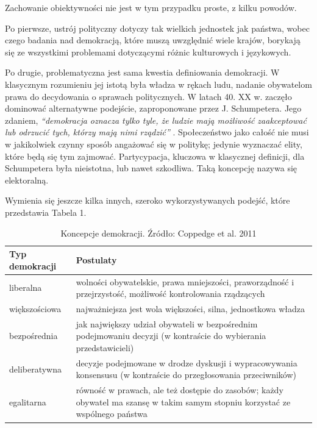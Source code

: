 \documentclass[12pt]{article}
\begin{document}
Zachowanie obiektywności nie jest w tym przypadku proste, z kilku powodów.

Po pierwsze, ustrój polityczny dotyczy tak wielkich jednostek jak państwa, wobec czego badania nad demokracją, które muszą uwzględnić wiele krajów, borykają się ze wszystkimi problemami dotyczącymi różnic kulturowych i językowych.

Po drugie, problematyczna jest sama kwestia definiowania demokracji. W klasycznym rozumieniu jej istotą była władza w rękach ludu, nadanie obywatelom prawa do decydowania o sprawach politycznych. W latach 40. XX w. zaczęło dominować alternatywne podejście, zaproponowane przez J. Schumpetera. Jego zdaniem, \emph{``demokracja oznacza tylko tyle, że ludzie mają możliwość zaakceptować lub odrzucić tych, którzy mają nimi rządzić''} \citep{Schumpeter}. Społeczeństwo jako całość nie musi w jakikolwiek czynny sposób angażować się w politykę; jedynie wyznaczać elity, które będą się tym zajmować. Partycypacja, kluczowa w klasycznej definicji, dla Schumpetera była nieistotna, lub nawet szkodliwa. Taką koncepcję nazywa się elektoralną.

Wymienia się jeszcze kilka innych, szeroko wykorzystywanych podejść, które przedstawia Tabela 1.

\begin{table}

\begin{longtable}[t]{l|>{\raggedright\arraybackslash}p{30em}}
\caption{\label{tab:dem-types}Koncepcje demokracji. Źródło: Coppedge et al. 2011}\\
\hline
Typ demokracji &  Postulaty\\
\hline
liberalna & wolności obywatelskie, prawa mniejszości, praworządność i przejrzystość, możliwość kontrolowania rządzących\\
\hline
większościowa & najważniejsza jest wola większości, silna, jednostkowa władza\\
\hline
bezpośrednia & jak największy udział obywateli w bezpośrednim podejmowaniu decyzji (w kontraście do wybierania przedstawicieli)\\
\hline
deliberatywna & decyzje podejmowane w drodze dyskusji i wypracowywania konsensusu (w kontraście do przegłosowania przeciwników)\\
\hline
egalitarna & równość w prawach, ale też dostępie do zasobów; każdy obywatel ma szansę w takim samym stopniu korzystać ze wspólnego państwa\\
\hline
\end{longtable}
\end{table}
\end{document}
